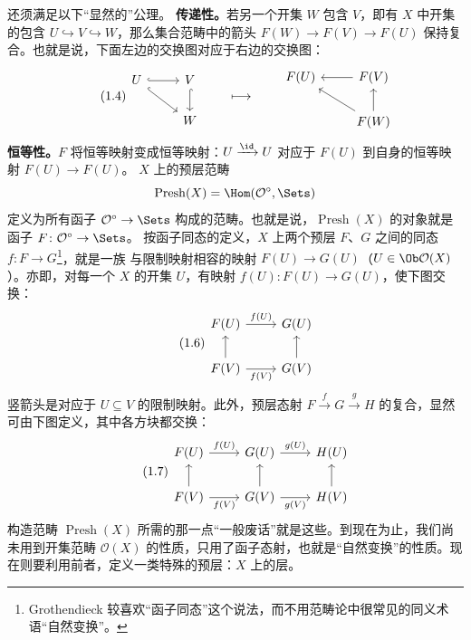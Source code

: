 还须满足以下“显然的”公理。
\textbf{传递性。}若另一个开集 $W$ 包含 $V$，即有 $X$ 中开集的包含 $U\hookrightarrow V\hookrightarrow W$，那么集合范畴中的箭头 $F(W)\to F(V)\to F(U)$ 保持复合。也就是说，下面左边的交换图对应于右边的交换图：
\begin{equation}\tag{1.4}
\begin{tikzcd}[ampersand replacement=\&]
U\arrow[r,hook]\arrow[dr,hook]\&V\arrow[d,hook]\\
\&W
\end{tikzcd}
\qquad\longmapsto\qquad
\begin{tikzcd}[ampersand replacement=\&]
F(U)\&F(V)\arrow[l]\\
\&F(W)\arrow[u]\arrow[ul]
\end{tikzcd}
\end{equation}
\textbf{恒等性。}$F$ 将恒等映射变成恒等映射：$U\xrightarrow{\id}U$ 对应于 $F(U)$ 到自身的恒等映射 $F(U)\to F(U)$。
$X$ 上的预层范畴
\[
 \operatorname{Presh}(X)=\Hom(\mathcal O^{\circ},\Sets)
\]
定义为所有函子 $\mathcal O^{\circ}\to\Sets$ 构成的范畴。也就是说，$\operatorname{Presh}(X)$ 的对象就是函子 $F\colon\mathcal O^{\circ}\to\Sets$。
按函子同态的定义，$X$ 上两个预层 $F$、$G$ 之间的同态 $f\colon F\to G$\footnote{Grothendieck 较喜欢“函子同态”这个说法，而不用范畴论中很常见的同义术语“自然变换”。}，就是一族
与限制映射相容的映射 $F(U)\to G(U)$（$U\in\Ob\mathcal O(X)$）。亦即，对每一个 $X$ 的开集 $U$，有映射 $f(U)\colon F(U)\to G(U)$，使下图交换：
\begin{equation}\tag{1.6}
\begin{tikzcd}[ampersand replacement=\&]
F(U)\arrow[r,"f(U)"]\&G(U)\\
F(V)\arrow[u]\arrow[r,"f(V)"']\&G(V)\arrow[u]
\end{tikzcd}
\end{equation}
竖箭头是对应于 $U\subseteq V$ 的限制映射。此外，预层态射 $F\xrightarrow fG\xrightarrow gH$ 的复合，显然可由下图定义，其中各方块都交换：
\begin{equation}\tag{1.7}
\begin{tikzcd}[ampersand replacement=\&]
F(U)\arrow[r,"f(U)"]\&G(U)\arrow[r,"g(U)"]\&H(U)\\
F(V)\arrow[u]\arrow[r,"f(V)"']\&G(V)\arrow[u]\arrow[r,"g(V)"']\&H(V)\arrow[u]
\end{tikzcd}
\end{equation}
构造范畴 $\operatorname{Presh}(X)$ 所需的那一点“一般废话”就是这些。到现在为止，我们尚未用到开集范畴 $\mathcal O(X)$ 的性质，只用了函子态射，也就是“自然变换”的性质。现在则要利用前者，定义一类特殊的预层：$X$ 上的层。
